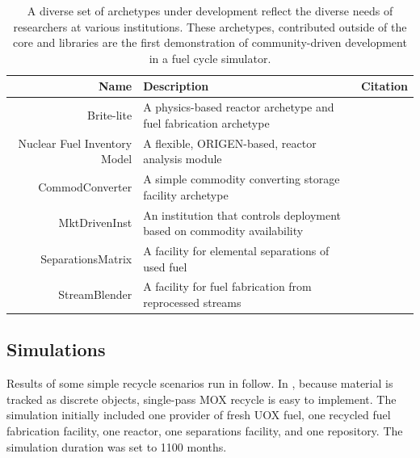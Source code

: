 \begin{table}
\centering
\begin{tabularx}{\textwidth}{|r|X|r|}
\hline
\textbf{Name} & \textbf{Description} & \textbf{Citation} \\
\hline
Brite-lite & A physics-based reactor archetype and fuel fabrication archetype & \cite{brightlite} \\
Nuclear Fuel Inventory Model & A flexible, ORIGEN-based, reactor analysis module & \cite{NFIM} \\
CommodConverter & A simple commodity converting storage facility archetype  & \cite{commodconverter} \\
MktDrivenInst & An institution that controls deployment based on commodity availability & \cite{mktdriveninst} \\
SeparationsMatrix & A facility for elemental separations of used fuel & \cite{streamblender} \\
StreamBlender & A facility for fuel fabrication from reprocessed streams & \cite{streamblender} \\
\hline
\end{tabularx}
\caption{A diverse set of archetypes under development reflect the diverse 
needs of researchers at various institutions. These archetypes, contributed 
outside of the \Cyclus core and \Cycamore libraries are the first demonstration 
of community-driven development in a fuel cycle simulator.}
\label{tab:archetypes}
\end{table}


\subsection{Simulations}


Results of some simple recycle scenarios run in \Cyclus follow.  In \Cyclus,
because material is tracked as discrete objects, single-pass MOX recycle is
easy to implement.  The simulation initially included one provider of fresh
UOX fuel, one recycled fuel fabrication facility, one reactor, one separations
facility, and one repository. The simulation duration was set to 1100 months.


